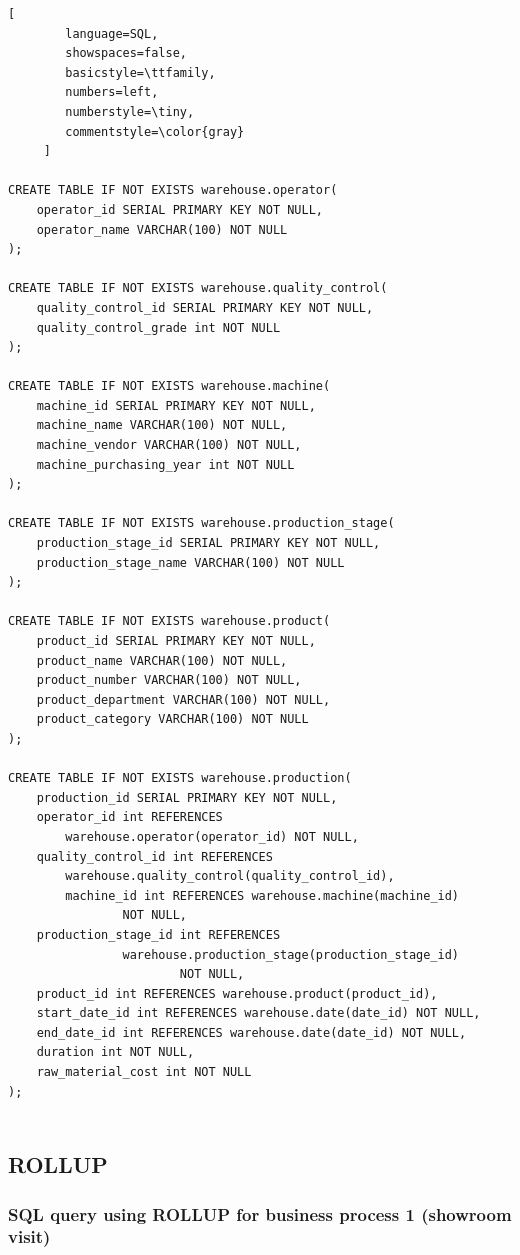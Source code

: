 \documentclass[letterpaper,12pt]{article}
\begin{document}
\begin{lstlisting}[
        language=SQL,
        showspaces=false,
        basicstyle=\ttfamily,
        numbers=left,
        numberstyle=\tiny,
        commentstyle=\color{gray}
     ]
		
CREATE TABLE IF NOT EXISTS warehouse.operator(
  	operator_id SERIAL PRIMARY KEY NOT NULL,
  	operator_name VARCHAR(100) NOT NULL
);

CREATE TABLE IF NOT EXISTS warehouse.quality_control(
  	quality_control_id SERIAL PRIMARY KEY NOT NULL,
  	quality_control_grade int NOT NULL
);

CREATE TABLE IF NOT EXISTS warehouse.machine(
  	machine_id SERIAL PRIMARY KEY NOT NULL,
  	machine_name VARCHAR(100) NOT NULL,
  	machine_vendor VARCHAR(100) NOT NULL,
  	machine_purchasing_year int NOT NULL
);

CREATE TABLE IF NOT EXISTS warehouse.production_stage(
  	production_stage_id SERIAL PRIMARY KEY NOT NULL,
  	production_stage_name VARCHAR(100) NOT NULL
);

CREATE TABLE IF NOT EXISTS warehouse.product(
  	product_id SERIAL PRIMARY KEY NOT NULL,
  	product_name VARCHAR(100) NOT NULL,
  	product_number VARCHAR(100) NOT NULL,
  	product_department VARCHAR(100) NOT NULL,
  	product_category VARCHAR(100) NOT NULL
);

CREATE TABLE IF NOT EXISTS warehouse.production(
	production_id SERIAL PRIMARY KEY NOT NULL,
	operator_id int REFERENCES 
		warehouse.operator(operator_id) NOT NULL,
	quality_control_id int REFERENCES 
		warehouse.quality_control(quality_control_id),
        machine_id int REFERENCES warehouse.machine(machine_id) 
                NOT NULL,
	production_stage_id int REFERENCES 
                warehouse.production_stage(production_stage_id) 
                        NOT NULL,
	product_id int REFERENCES warehouse.product(product_id),
	start_date_id int REFERENCES warehouse.date(date_id) NOT NULL,
	end_date_id int REFERENCES warehouse.date(date_id) NOT NULL,
	duration int NOT NULL,
	raw_material_cost int NOT NULL
);		
		
\end{lstlisting}

\subsection{ROLLUP}
\subsubsection{SQL query using ROLLUP for business process 1 (showroom visit)}
\end{document}

